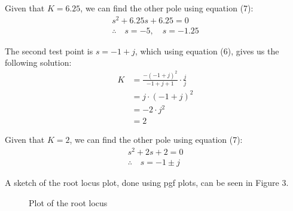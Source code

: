 \documentclass{article}
\begin{document}
	Given that $K = 6.25$, we can find the other pole using equation (7):
	\begin{align*}
		s^2 + 6.25s + 6.25 = 0\\
		\therefore \quad s=-5, \quad s=-1.25
	\end{align*}
	
	The second test point is $s = -1 + j$, which using equation (6), gives us the following solution:
	\begin{align*}
		K 	&= \frac{-(-1+j)^2}{-1 + j + 1} \cdot \frac{j}{j}\\
			&= j \cdot (-1 + j)^2\\
			&= -2 \cdot j^2\\
			&= 2
	\end{align*}
	
	Given that $K = 2$, we can find the other pole using equation (7):
	\begin{align*}
		s^2 + 2s + 2 = 0\\
		\therefore \quad s = -1 \pm j
	\end{align*}
	
	\newpage
	
	A sketch of the root locus plot, done using pgf plots, can be seen in Figure 3.
	\begin{figure}[h]
		\centering
		\caption{Plot of the root locus}
	\end{figure}
	
	\newpage
	
\end{document}
